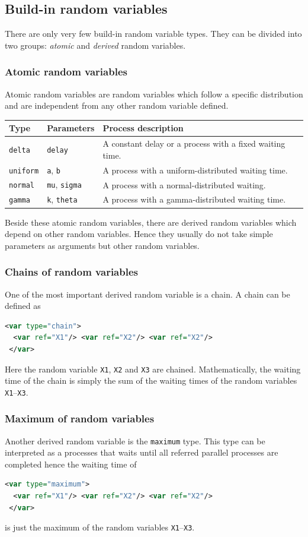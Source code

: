\documentclass[a4paper, 10pt]{paper}
\newcommand{\code}[1]{\texttt{#1}}
\begin{document}
\subsection{Build-in random variables}
There are only very few build-in random variable types. They can be divided into two groups:
\emph{atomic} and \emph{derived} random variables.

\subsubsection{Atomic random variables}
Atomic random variables are random variables which follow a specific
distribution and are independent from any other random variable defined.

\begin{tabular}{l|l|l}
 Type & Parameters & Process description \\ \hline
 \code{delta} & \code{delay} & A constant delay or a process with a fixed waiting time. \\
 \code{uniform} & \code{a}, \code{b} & A process with a uniform-distributed waiting time. \\
 \code{normal} & \code{mu}, \code{sigma} & A process with a normal-distributed waiting. \\
 \code{gamma} & \code{k}, \code{theta} & A process with a gamma-distributed waiting time.
\end{tabular}

Beside these atomic random variables, there are derived random variables which depend on other
random variables. Hence they usually do not take simple parameters as arguments but other 
random variables.

\subsubsection{Chains of random variables}
One of the most important derived random variable is a chain. A chain can be defined as
\begin{lstlisting}[language=XML]
 <var type="chain">
  <var ref="X1"/> <var ref="X2"/> <var ref="X2"/>
 </var>
\end{lstlisting}

Here the random variable \code{X1}, \code{X2} and \code{X3} are chained. Mathematically,
the waiting time of the chain is simply the sum of the waiting times of the random variables
\code{X1}--\code{X3}.

\subsubsection{Maximum of random variables}
Another derived random variable is the \code{maximum} type. This type can be interpreted as a
processes that waits until all referred parallel processes are completed hence the waiting time
of
\begin{lstlisting}[language=XML]
 <var type="maximum">
  <var ref="X1"/> <var ref="X2"/> <var ref="X2"/>
 </var>
\end{lstlisting}
is just the maximum of the random variables \code{X1}--\code{X3}.
\end{document}
